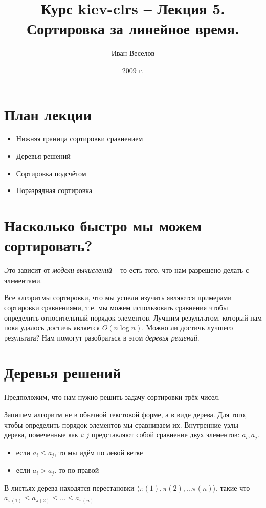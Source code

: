 \documentclass[a4paper,11pt]{article}
\author{Иван Веселов}
\title{Курс kiev-clrs -- Лекция 5. Сортировка за линейное время.}
\date{2009 г.}
\begin{document}
\maketitle
\tableofcontents
\newpage

\setlength{\parskip}{1ex plus 0.5ex minus 0.2ex}

\section{План лекции}
\begin{itemize}
\item Нижняя граница сортировки сравнением
\item Деревья решений
\item Сортировка подсчётом
\item Поразрядная сортировка
\end{itemize}

\section{Насколько быстро мы можем сортировать?}
Это зависит от \emph{модели вычислений} -- то есть того, что нам разрешено
делать с элементами.

Все алгоритмы сортировки, что мы успели изучить являются примерами сортировки
сравнениями, т.е. мы можем использовать сравнения чтобы определить относительный
порядок элементов. Лучшим результатом, который нам пока удалось достичь является
$O(n \log n)$. Можно ли достичь лучшего результата? Нам помогут разобраться в
этом \emph{деревья решений}.

\section{Деревья решений}

Предположим, что нам нужно решить задачу сортировки трёх чисел.

Запишем алгоритм не в обычной текстовой форме, а в виде дерева. Для того, чтобы
определить порядок элементов мы сравниваем их. Внутренние узлы дерева,
помеченные как $i:j$ представляют собой сравнение двух элементов: $a_i, a_j$.
\begin{itemize}
\item если $a_i \leqslant a_j$, то мы идём по левой ветке
\item если $a_i > a_j$. то по правой
\end{itemize}

В листьях дерева находятся перестановки $\langle \pi(1), \pi(2), \ldots \pi(n)
\rangle $, такие что $a_{\pi(1)} \leqslant a_{\pi(2)} \leqslant \ldots \leqslant a_{\pi(n)}$
\end{document}
